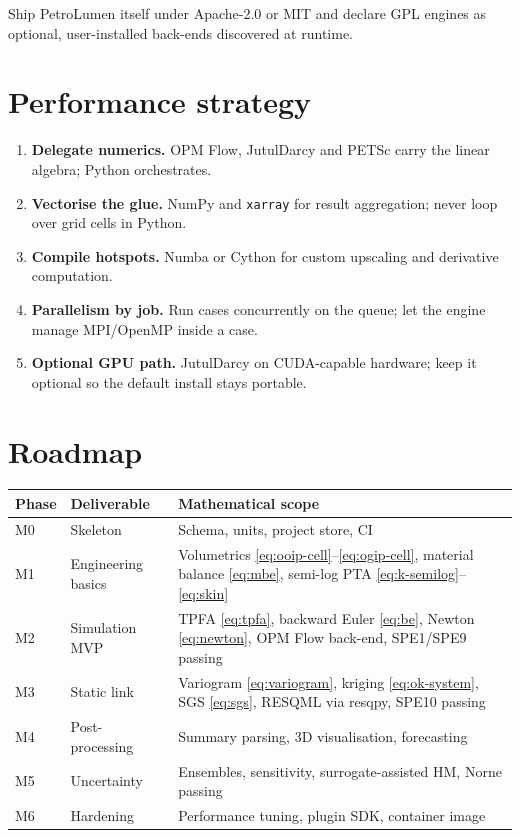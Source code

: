 \documentclass[10pt,a4paper]{article}
\begin{document}
Ship PetroLumen itself under Apache-2.0 or MIT and declare GPL engines as
optional, user-installed back-ends discovered at runtime.

\section{Performance strategy}

\begin{enumerate}[leftmargin=1.4em]
  \item \textbf{Delegate numerics.} OPM Flow, JutulDarcy and PETSc carry the
        linear algebra; Python orchestrates.
  \item \textbf{Vectorise the glue.} NumPy and \texttt{xarray} for result
        aggregation; never loop over grid cells in Python.
  \item \textbf{Compile hotspots.} Numba or Cython for custom upscaling and
        derivative computation.
  \item \textbf{Parallelism by job.} Run cases concurrently on the queue; let
        the engine manage MPI/OpenMP inside a case.
  \item \textbf{Optional GPU path.} JutulDarcy on CUDA-capable hardware; keep
        it optional so the default install stays portable.
\end{enumerate}

\section{Roadmap}

\begin{longtable}{@{}p{1.4cm}p{4.6cm}p{8.2cm}@{}}
\toprule
\textbf{Phase} & \textbf{Deliverable} & \textbf{Mathematical scope}\\
\midrule
M0 & Skeleton & Schema, units, project store, CI\\
M1 & Engineering basics & Volumetrics \eqref{eq:ooip-cell}--\eqref{eq:ogip-cell},
material balance \eqref{eq:mbe}, semi-log PTA \eqref{eq:k-semilog}--\eqref{eq:skin}\\
M2 & Simulation MVP & TPFA \eqref{eq:tpfa}, backward Euler \eqref{eq:be},
Newton \eqref{eq:newton}, OPM Flow back-end, SPE1/SPE9 passing\\
M3 & Static link & Variogram \eqref{eq:variogram}, kriging \eqref{eq:ok-system},
SGS \eqref{eq:sgs}, RESQML via resqpy, SPE10 passing\\
M4 & Post-processing & Summary parsing, 3D visualisation, forecasting\\
M5 & Uncertainty & Ensembles, sensitivity, surrogate-assisted HM, Norne passing\\
M6 & Hardening & Performance tuning, plugin SDK, container image\\
\bottomrule
\end{longtable}
\end{document}
